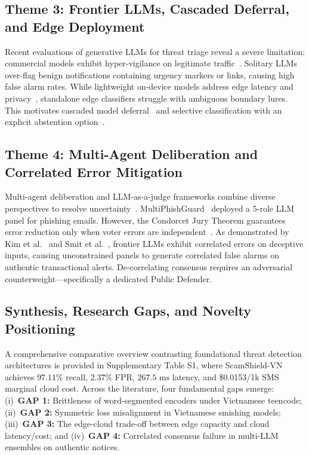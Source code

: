 \documentclass[journal]{IEEEtran}
\begin{document}
\subsection{Theme 3: Frontier LLMs, Cascaded Deferral, and Edge Deployment}
Recent evaluations of generative LLMs for threat triage reveal a severe limitation: commercial models exhibit hyper-vigilance on legitimate traffic~\cite{zhou2026fraudsmswalker}. Solitary LLMs over-flag benign notifications containing urgency markers or links, causing high false alarm rates. While lightweight on-device models address edge latency and privacy~\cite{banda2026quishingshield, phap2026edgeai}, standalone edge classifiers struggle with ambiguous boundary lures. This motivates cascaded model deferral~\cite{chen2023frugalgpt, mozannar2020consistent} and selective classification with an explicit abstention option~\cite{chow1970optimum}.

\subsection{Theme 4: Multi-Agent Deliberation and Correlated Error Mitigation}
Multi-agent deliberation and LLM-as-a-judge frameworks combine diverse perspectives to resolve uncertainty~\cite{chan2024chateval, du2024improving, verga2024poll}. MultiPhishGuard~\cite{chen2025multiphishguard} deployed a 5-role LLM panel for phishing emails. However, the Condorcet Jury Theorem guarantees error reduction only when voter errors are independent~\cite{ladha1992condorcet}. As demonstrated by Kim et al.~\cite{kim2025correlated} and Smit et al.~\cite{smit2024should}, frontier LLMs exhibit correlated errors on deceptive inputs, causing unconstrained panels to generate correlated false alarms on authentic transactional alerts. De-correlating consensus requires an adversarial counterweight---specifically a dedicated Public Defender.

\subsection{Synthesis, Research Gaps, and Novelty Positioning}
\label{subsec:gaps}
A comprehensive comparative overview contrasting foundational threat detection architectures is provided in Supplementary Table S1, where ScamShield-VN achieves $97.11\%$ recall, $2.37\%$ FPR, $267.5\text{ ms}$ latency, and \$0.0153/1k SMS marginal cloud cost. Across the literature, four fundamental gaps emerge: (i)~\textbf{GAP 1:} Brittleness of word-segmented encoders under Vietnamese teencode; (ii)~\textbf{GAP 2:} Symmetric loss misalignment in Vietnamese smishing models; (iii)~\textbf{GAP 3:} The edge-cloud trade-off between edge capacity and cloud latency/cost; and (iv)~\textbf{GAP 4:} Correlated consensus failure in multi-LLM ensembles on authentic notices.
\end{document}
